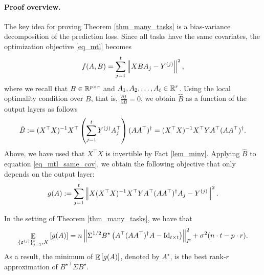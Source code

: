 	\paragraph{Proof overview.} The key idea for proving Theorem \ref{thm_many_tasks} is a bias-variance decomposition of the prediction loss.
	Since all tasks have the same covariates, the optimization objective \eqref{eq_mtl} becomes
	\begin{align}
		f(A, B) = \sum_{j=1}^t \left\| X B A_j - Y^{(j)} \right\|^2, \label{eq_mtl_same_cov}
	\end{align}
	where we recall that $B \in \mathbb{R}^{p \times r}$ and $A_1, A_2, \dots, A_t \in \mathbb{R}^r$.
	Using the local optimality condition over $B$, that is, $\frac{\partial f}{\partial B} = 0$, we obtain $\hat{B}$ as a function of the output layers as follows
	\begin{align} \label{eq_Bhat}
		\hat{B} := (X^{\top}X)^{-1} X^{\top} \left({\sum_{j=1}^t Y^{(j)} A_j^{\top}}\right) (A  A^{\top})^{\dagger}
		= (X^{\top} X)^{-1} X^{\top} Y A^{\top} (AA^{\top})^{\dagger}.
	\end{align}
	Above, we have used that $X^{\top}X$ is invertible by Fact \ref{lem_minv}.
	Applying $\hat{B}$ to equation \eqref{eq_mtl_same_cov}, we obtain the following objective that only depends on the output layer:
	\begin{align}
		g(A) := \sum_{j=1}^t \left\| X (X^{\top}X)^{-1}X^{\top} Y A^{\top} (AA^{\top})^{\dagger} A_j - Y^{(j)} \right\|^2. \label{eq_mtl_output_layer}
	\end{align}

	\begin{claim}\label{lem_exp_opt}
		In the setting of Theorem \ref{thm_many_tasks}, we have that
		\begin{align}
			\mathop{\mathbb{E}}_{\{\varepsilon^{(j)}\}_{j=1}^t, X}\left[ g(A) \right] = n \left\| \Sigma^{1/2} B^{\star} \left({A^{\top} (AA^{\top})^{\dagger} A - \operatorname{Id}_{t\times t}}\right) \right\|_{F}^2 + \sigma^2 (n\cdot t - p \cdot r). \label{eq_gA}
		\end{align}
		As a result, the minimum of $\mathop{\mathbb{E}}\left[ g(A) \right]$, denoted by $A^{\star}$, is the best rank-$r$ approximation of ${B^{\star}}^{\top}\Sigma B^{\star}$.
	\end{claim}

